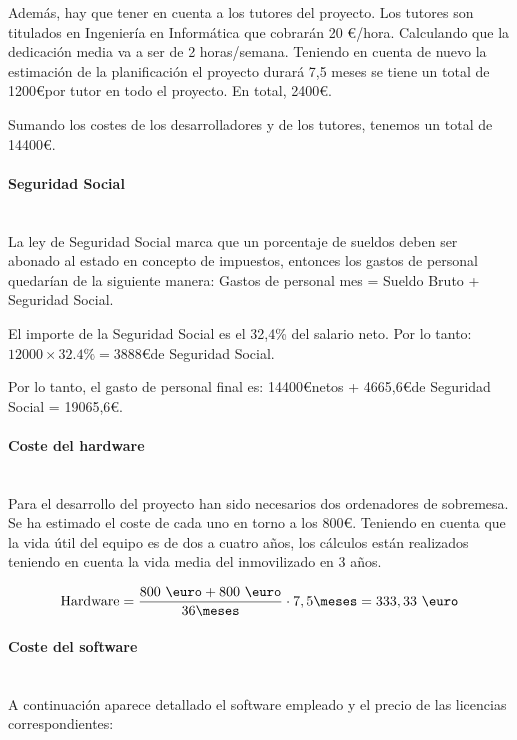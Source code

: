 Además, hay que tener en cuenta a los tutores del proyecto. Los tutores son titulados en Ingeniería en  Informática que cobrarán 20 \euro /hora. Calculando que la dedicación media va a ser de 2 horas/semana. Teniendo en cuenta de nuevo la estimación de la planificación el proyecto durará 7,5 meses se tiene un total de 1200\euro por tutor en todo el proyecto. En total, 2400\euro.

Sumando los costes de los desarrolladores y de los tutores, tenemos un total de 14400\euro.

\paragraph{Seguridad Social}\mbox{} \\
\indent La ley de Seguridad Social marca que un porcentaje de sueldos deben ser abonado al estado en concepto de impuestos, entonces los gastos de personal quedarían de la siguiente manera: Gastos de personal mes = Sueldo Bruto + Seguridad Social.

El importe de la Seguridad Social es el 32,4\% del salario neto. Por lo tanto: $12000\times32.4\%=3888$\euro de Seguridad Social.

Por lo tanto, el gasto de personal final es: 14400\euro netos + 4665,6\euro de Seguridad Social = 19065,6\euro.


\newcommand{\software}{\operatorname{Software}}
\newcommand{\hardware}{\operatorname{Hardware}}

\paragraph{Coste del hardware}\mbox{} \\
Para el desarrollo del proyecto han sido necesarios dos ordenadores de sobremesa. Se ha estimado el coste de cada uno en torno a los 800\euro. Teniendo en cuenta que la vida útil del equipo es de dos a cuatro años, los cálculos están realizados teniendo en cuenta la vida media del inmovilizado en 3 años.

 \[ 
   \hardware = \dfrac{800 \textup{ \euro} + 800\textup{ \euro}}{36 \meses} \cdot 7,5 \meses = 333,33 \textup{ \euro}
 \]



\paragraph{Coste del software}\mbox{} \\
A continuación  aparece detallado el software empleado y el precio de las licencias correspondientes:

